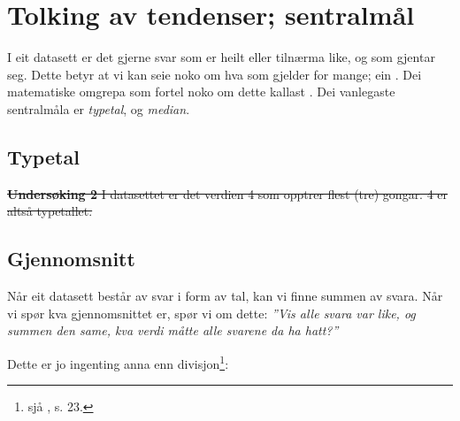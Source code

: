 \section{Tolking av tendenser; sentralmål}
I eit datasett er det gjerne svar som er heilt eller tilnærma like, og som gjentar seg. Dette betyr at vi kan seie noko om hva som gjelder for mange; ein . Dei matematiske omgrepa som fortel noko om dette kallast . Dei vanlegaste sentralmåla er \textit{typetal},  og \textit{median}. \vsk

\newpage
\subsection{Typetal}
 \regv
\st{
\textbf{Undersøking 2} \os
I datasettet er det verdien 4 som opptrer flest (tre) gongar. 4 er altså typetallet.
} 

\subsection{Gjennomsnitt}
Når eit datasett består av svar i form av tal, kan vi finne summen av svara. Når vi spør kva gjennomsnittet er, spør vi om dette: \os
\textsl{''Vis alle svara var like, og summen den same, kva verdi måtte alle svarene da ha hatt?''}\os

Dette er jo ingenting anna enn divisjon\footnote{sjå \mb, s. 23.}: \regv

\reg[Gjennomsnitt]{ \vs
\[ \text{gjennomsnitt}=\frac{\text{summen av verdiane frå datasettet}}{\text{antall verdier}} \]
} \regv

